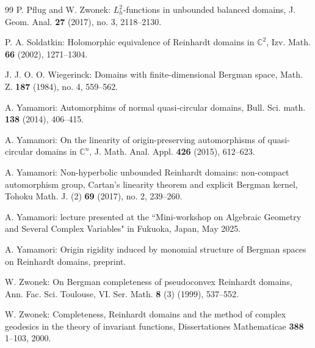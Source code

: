 \documentclass[12pt]{amsart}
\numberwithin{equation}{section}
\theoremstyle{definition}
\theoremstyle{remark}
\newcommand{\C}{{\mathbb C}}
\newcommand{\1}{{\bf 1}}
\begin{document}
\begin{thebibliography}{99}
P. Pflug and W. Zwonek:
$L^2_h$-functions in unbounded balanced domains, 
J. Geom. Anal. {\bf 27} (2017), no. 3, 2118--2130.

P. A. Soldatkin: 
Holomorphic equivalence of Reinhardt domains in 
$\C^2$, Izv. Math. {\bf 66} (2002), 1271--1304. 


J. J. O. O. Wiegerinck:
Domains with finite-dimensional Bergman space, 
Math. Z. {\bf 187} (1984), no. 4, 559--562.

A. Yamamori:
Automorphims of normal quasi-circular domains, 
Bull. Sci. math. {\bf 138} (2014), 406--415.

A. Yamamori:
On the linearity of origin-preserving automorphisms
of quasi-circular domains in $\C^n$, 
J. Math. Anal. Appl. {\bf 426} (2015), 
612--623.


A. Yamamori:
Non-hyperbolic unbounded Reinhardt domains: 
non-compact automorphism group, 
Cartan's linearity theorem and explicit Bergman kernel, 
Tohoku Math. J. (2) {\bf 69} (2017), no. 2, 
239--260.

A. Yamamori: lecture presented at the 
``Mini-workshop on Algebraic Geometry and 
Several Complex Variables" in Fukuoka, 
Japan, May 2025.

A. Yamamori: 
Origin rigidity induced by monomial structure
of Bergman spaces on Reinhardt domains, 
preprint.

W. Zwonek: 
On Bergman completeness of pseudoconvex Reinhardt
domains, Ann. Fac. Sci. Toulouse, VI. Ser. Math. {\bf 8} (3)
(1999), 537--552.

W. Zwonek:
Completeness, Reinhardt domains 
and the method of complex geodesics 
in the theory of invariant functions, 
Dissertationes Mathematicae {\bf 388} 1--103, 2000.


\end{thebibliography}
\end{document}
